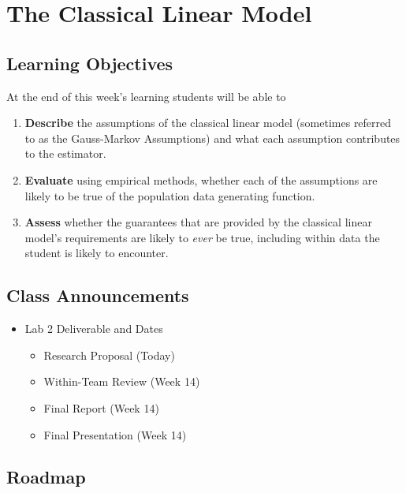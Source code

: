 \documentclass[
  letterpaper,
  DIV=11,
  numbers=noendperiod]{scrreprt}
\providecommand{\tightlist}{%
  \setlength{\itemsep}{0pt}\setlength{\parskip}{0pt}}\usepackage{longtable,booktabs,array}
\begin{document}
\chapter{The Classical Linear Model}\label{the-classical-linear-model}

\section{Learning Objectives}\label{learning-objectives-11}

At the end of this week's learning students will be able to

\begin{enumerate}
\def\labelenumi{\arabic{enumi}.}
\tightlist
\item
  \textbf{Describe} the assumptions of the classical linear model
  (sometimes referred to as the Gauss-Markov Assumptions) and what each
  assumption contributes to the estimator.
\item
  \textbf{Evaluate} using empirical methods, whether each of the
  assumptions are likely to be true of the population data generating
  function.
\item
  \textbf{Assess} whether the guarantees that are provided by the
  classical linear model's requirements are likely to \emph{ever} be
  true, including within data the student is likely to encounter.
\end{enumerate}

\section{Class Announcements}\label{class-announcements-10}

\begin{itemize}
\tightlist
\item
  Lab 2 Deliverable and Dates

  \begin{itemize}
  \tightlist
  \item
    Research Proposal (Today)
  \item
    Within-Team Review (Week 14)
  \item
    Final Report (Week 14)
  \item
    Final Presentation (Week 14)
  \end{itemize}
\end{itemize}

\section{Roadmap}\label{roadmap-8}
\end{document}
